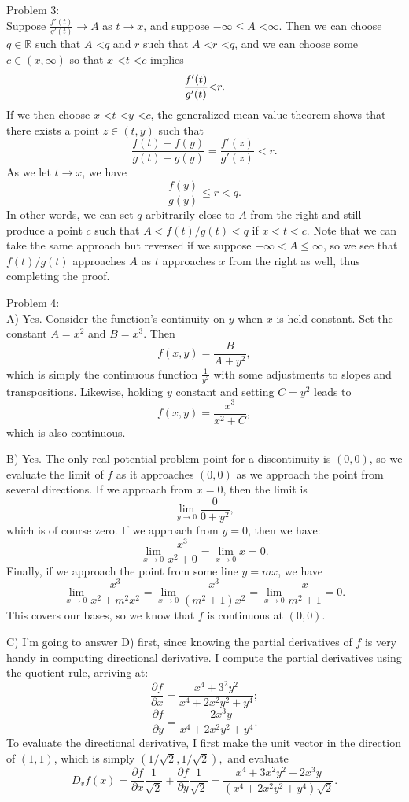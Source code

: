 \documentclass[12pt,leqno]{article}
\begin{document}
\bigskip
\noindent Problem 3:\\
\indent Suppose $\frac{f'(t)}{g'(t)} \rightarrow A$ as $t \rightarrow x$, and suppose $-\infty \leq A$ \textless $\infty.$ Then we can choose $q \in \mathds{R}$ such that $A$ \textless $q$ and $r$ such that $A$ \textless $r$ \textless $q$, and we can choose some $c \in (x, \infty)$ so that $x$ \textless $t$ \textless $c$ implies
$$\frac{f'(t)}{g'(t)} \text{\textless} r.$$
If we then choose $x$ \textless $t$ \textless $y$ \textless $c$, the generalized mean value theorem shows that there exists a point $z \in (t, y)$ such that
$$\frac{f(t) - f(y)}{g(t) - g(y)} = \frac{f'(z)}{g'(z)} < r.$$
As we let $t \rightarrow x$, we have
$$\frac{f(y)}{g(y)} \leq r < q.$$
In other words, we can set $q$ arbitrarily close to $A$ from the right and still produce a point $c$ such that $A<f(t)/g(t)<q$ if $x<t<c$. Note that we can take the same approach but reversed if we suppose $-\infty < A \leq \infty$, so we see that $f(t)/g(t)$ approaches $A$ as $t$ approaches $x$ from the right as well, thus completing the proof.


\bigskip
\noindent Problem 4:\\
\indent A) Yes. Consider the function's continuity on $y$ when $x$ is held constant. Set the constant $A = x^2$ and $B = x^3$. Then 
$$f(x, y) = \frac{B}{A + y^2},$$
which is simply the continuous function $\frac{1}{y^2}$ with some adjustments to slopes and transpositions. Likewise, holding $y$ constant and setting $C = y^2$ leads to 
$$f(x, y) = \frac{x^3}{x^2 + C},$$
which is also continuous.

\indent B) Yes. The only real potential problem point for a discontinuity is $(0, 0)$, so we evaluate the limit of $f$ as it approaches $(0, 0)$ as we approach the point from several directions. If we approach from $x=0$, then the limit is
$$\lim_{y \rightarrow 0} \frac{0}{0 + y^2},$$
which is of course zero. If we approach from $y = 0$, then we have:
$$\lim_{x \rightarrow 0} \frac{x^3}{x^2 + 0} = \lim_{x \rightarrow 0} x = 0.$$
Finally, if we approach the point from some line $y = mx$, we have
$$\lim_{x \rightarrow 0}\frac{x^3}{x^2 + m^2x^2} =\lim_{x \rightarrow 0}\frac{x^3}{(m^2 + 1)x^2} = \lim_{x \rightarrow 0} \frac{x}{m^2 + 1} = 0.$$
This covers our bases, so we know that $f$ is continuous at $(0, 0)$. 

\indent C) I'm going to answer D) first, since knowing the partial derivatives of $f$ is very handy in computing directional derivative. I compute the partial derivatives using the quotient rule, arriving at:
$$\frac{\partial f}{\partial x} = \frac{x^4 + 3^2y^2}{x^4 + 2x^2y^2 + y^4};$$
$$\frac{\partial f}{\partial y} = \frac{-2x^3y}{x^4 + 2x^2y^2 + y^4}.$$
To evaluate the directional derivative, I first make the unit vector in the direction of $(1, 1)$, which is simply $(1/\sqrt{2}, 1/\sqrt{2}),$ and evaluate
$$D_v f(x)= \frac{\partial f}{\partial x} \frac{1}{\sqrt{2}} + \frac{\partial f}{\partial y} \frac{1}{\sqrt{2}} = \frac{x^4 + 3x^2y^2 -2x^3y}{(x^4 + 2x^2y^2 + y^4)\sqrt{2}}.$$
\end{document}
